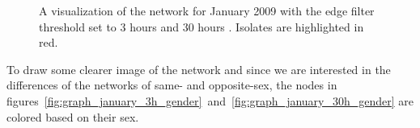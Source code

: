 \begin{figure}[htpb]%
	\centering 
	\qquad 
	\caption[Network visualizations with different edge filter thresholds]{A visualization of the network for January 2009 with the edge filter threshold set to 3 hours  and 30 hours . Isolates are highlighted in red.}  
	 
\end{figure}   

\clearpage

To draw some clearer image of the network and since we are interested in the differences of the networks of same- and opposite-sex, the nodes in figures~\ref{fig:graph_january_3h_gender}~and~\ref{fig:graph_january_30h_gender} are colored based on their sex.

